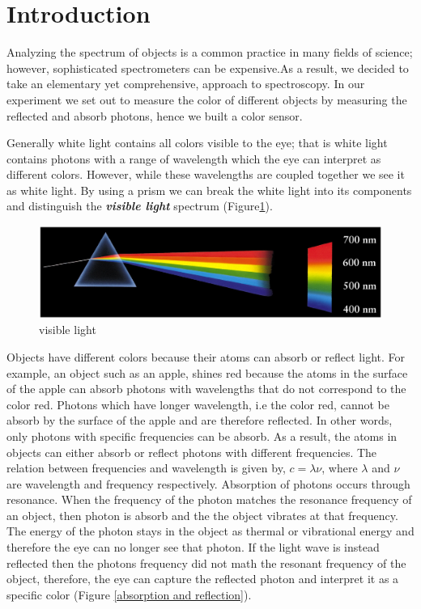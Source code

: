 \documentclass[paper=letter, fontsize=12pt]{article}
\begin{document}
\section*{Introduction}
Analyzing the spectrum of objects is a common practice in many fields of science; however, sophisticated spectrometers can be expensive.As a result, we decided to take an elementary yet comprehensive, approach to spectroscopy. In our experiment we set out to measure the color of different objects by measuring the reflected and absorb photons, hence we built a color sensor. 

	Generally white light contains all colors visible to the eye; that is white light contains photons with a range of wavelength which the eye can interpret as different colors. However, while these wavelengths are coupled together we see it as white light. By using a prism we can break the white light into its components and distinguish the \textbf{\textit{visible light}} spectrum (Figure\ref*{prism}). 

	\begin{figure}[H]
	\centering
	\includegraphics[scale=.4]{prism.jpg}
	\caption{visible light }
	\label{prism}
	\end{figure}

	Objects have different colors because their atoms can absorb or reflect light. For example, an object such as an apple, shines red because the atoms in the surface of the apple can absorb photons with wavelengths that do not correspond to the color red. Photons which have longer wavelength, i.e the color red, cannot be absorb by the surface of the apple and are therefore reflected. In other words, only photons with specific frequencies can be absorb. As a result, the atoms in objects can either absorb or reflect photons with different frequencies. The relation between frequencies and wavelength is given by, $c=\lambda \nu$, where $\lambda$ and $\nu$ are wavelength and frequency respectively. Absorption of photons occurs through resonance. When the frequency of the photon matches the resonance frequency of an object, then photon is absorb and the the object vibrates at that frequency. The energy of the photon stays in the object as thermal or vibrational energy and therefore the eye can no longer see that photon. If the light wave is instead reflected then the photons frequency did not math the resonant frequency of the object, therefore, the eye can capture the reflected photon and interpret it as a specific color (Figure \ref*{absorption and reflection}).
\end{document}

